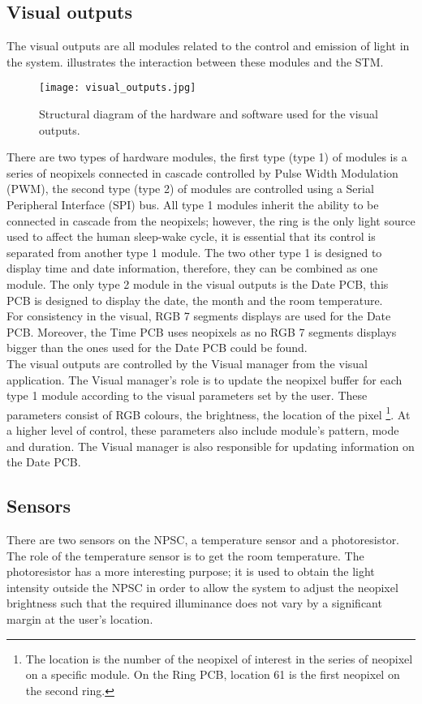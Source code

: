\subsection{Visual outputs}
The visual outputs are all modules related to the control and emission of light in the system.  illustrates the interaction between these modules and the STM. 
\begin{figure}[ht]
\centering
\texttt{[image: visual\_outputs.jpg]}
\caption{Structural diagram of the hardware and software used for the visual outputs.}
\label{fig:visual_outputs}
\end{figure}
There are two types of hardware modules, the first type (type 1) of modules is a series of neopixels connected in cascade controlled by Pulse Width Modulation (PWM), the second type (type 2) of modules are controlled using a Serial Peripheral Interface (SPI) bus. All type 1 modules inherit the ability to be connected in cascade from the neopixels; however, the ring is the only light source used to affect the human sleep-wake cycle, it is essential that its control is separated from another type 1 module. The two other type 1 is designed to display time and date information, therefore, they can be combined as one module. The only type 2 module in the visual outputs is the Date PCB, this PCB is designed to display the date, the month and the room temperature.\\
For consistency in the visual, RGB 7 segments displays are used for the Date PCB. Moreover, the Time PCB uses neopixels as no RGB 7 segments displays bigger than the ones used for the Date PCB could be found.\\
The visual outputs are controlled by the Visual manager from the visual application. The Visual manager's role is to update the neopixel buffer for each type 1 module according to the visual parameters set by the user. These parameters consist of RGB colours, the brightness, the location of the pixel \footnote{The location is the number of the neopixel of interest in the series of neopixel on a specific module. On the Ring PCB, location 61 is the first neopixel on the second ring.}. At a higher level of control, these parameters also include module's pattern, mode and duration. The Visual manager is also responsible for updating information on the Date PCB.   

\subsection{Sensors}
There are two sensors on the NPSC, a temperature sensor and a photoresistor. The role of the temperature sensor is to get the room temperature. The photoresistor has a more interesting purpose; it is used to obtain the light intensity outside the NPSC in order to allow the system to adjust the neopixel brightness such that the required illuminance does not vary by a significant margin at the user's location.



